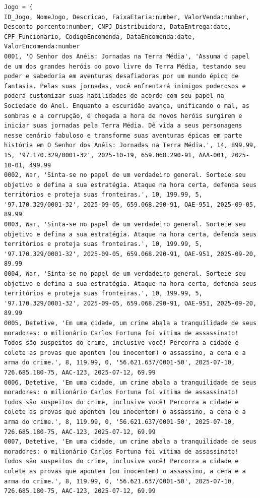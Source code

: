 \documentclass[11pt]{article}
\begin{document}
\begin{Verbatim}[breaklines=true, breakanywhere=true]
Jogo = {
ID_Jogo, NomeJogo, Descricao, FaixaEtaria:number, ValorVenda:number, Desconto_porcento:number, CNPJ_Distribuidora, DataEntrega:date, CPF_Funcionario, CodigoEncomenda, DataEncomenda:date, ValorEncomenda:number
0001, 'O Senhor dos Anéis: Jornadas na Terra Média', 'Assuma o papel de um dos grandes heróis do povo livre da Terra Média, testando seu poder e sabedoria em aventuras desafiadoras por um mundo épico de fantasia. Pelas suas jornadas, você enfrentará inimigos poderosos e poderá customizar suas habilidades de acordo com seu papel na Sociedade do Anel. Enquanto a escuridão avança, unificando o mal, as sombras e a corrupção, é chegada a hora de novos heróis surgirem e iniciar suas jornadas pela Terra Média. Dê vida a seus personagens nesse cenário fabuloso e transforme suas aventuras épicas em parte história em O Senhor dos Anéis: Jornadas na Terra Média.', 14, 899.99, 15, '97.170.329/0001-32', 2025-10-19, 659.068.290-91, AAA-001, 2025-10-01, 499.99
0002, War, 'Sinta-se no papel de um verdadeiro general. Sorteie seu objetivo e defina a sua estratégia. Ataque na hora certa, defenda seus territórios e proteja suas fronteiras.', 10, 199.99, 5, '97.170.329/0001-32', 2025-09-05, 659.068.290-91, OAE-951, 2025-09-05, 89.99
0003, War, 'Sinta-se no papel de um verdadeiro general. Sorteie seu objetivo e defina a sua estratégia. Ataque na hora certa, defenda seus territórios e proteja suas fronteiras.', 10, 199.99, 5, '97.170.329/0001-32', 2025-09-05, 659.068.290-91, OAE-951, 2025-09-20, 89.99
0004, War, 'Sinta-se no papel de um verdadeiro general. Sorteie seu objetivo e defina a sua estratégia. Ataque na hora certa, defenda seus territórios e proteja suas fronteiras.', 10, 199.99, 5, '97.170.329/0001-32', 2025-09-05, 659.068.290-91, OAE-951, 2025-09-20, 89.99
0005, Detetive, 'Em uma cidade, um crime abala a tranquilidade de seus moradores: o milionário Carlos Fortuna foi vítima de assassinato! Todos são suspeitos do crime, inclusive você! Percorra a cidade e colete as provas que apontem (ou inocentem) o assassino, a cena e a arma do crime.', 8, 119.99, 0, '56.621.637/0001-50', 2025-07-10, 726.685.180-75, AAC-123, 2025-07-12, 69.99
0006, Detetive, 'Em uma cidade, um crime abala a tranquilidade de seus moradores: o milionário Carlos Fortuna foi vítima de assassinato! Todos são suspeitos do crime, inclusive você! Percorra a cidade e colete as provas que apontem (ou inocentem) o assassino, a cena e a arma do crime.', 8, 119.99, 0, '56.621.637/0001-50', 2025-07-10, 726.685.180-75, AAC-123, 2025-07-12, 69.99
0007, Detetive, 'Em uma cidade, um crime abala a tranquilidade de seus moradores: o milionário Carlos Fortuna foi vítima de assassinato! Todos são suspeitos do crime, inclusive você! Percorra a cidade e colete as provas que apontem (ou inocentem) o assassino, a cena e a arma do crime.', 8, 119.99, 0, '56.621.637/0001-50', 2025-07-10, 726.685.180-75, AAC-123, 2025-07-12, 69.99

\end{Verbatim}
\end{document}
